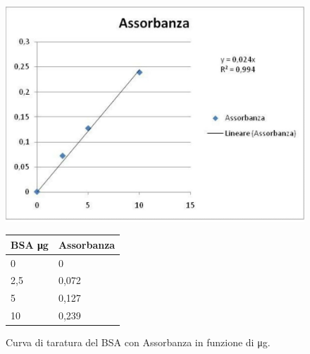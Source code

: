 \documentclass[twocolumn,a4paper,10pt]{my_report}
\begin{document}
{{\begin{figure}[htp]
\centering
\hfill
\begin{minipage}[b]{.3\columnwidth}
  \centering
  \includegraphics[width=1.5\linewidth]{BSA.jpg}
  \caption{Curva di taratura del BSA con Assorbanza in funzione di \si{\ug}.}\label{fig:BSA}
\end{minipage}\hfill
\begin{minipage}[b]{.3\columnwidth}
  \centering
  \begin{tabular}{|l|l|}
    \hline
    BSA \si{\ug} & Assorbanza \\ \hline
    0        & 0          \\ \hline
    2,5      & 0,072      \\ \hline
    5        & 0,127      \\ \hline
    10       & 0,239      \\ \hline
  \end{tabular}
\end{minipage}\hspace*{\fill}
\end{figure}

}}
\end{document}
